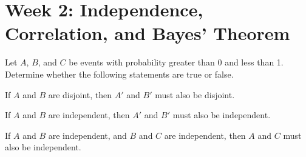 \documentclass[a4paper, 10pt]{article}
\begin{document}
\pagebreak

\section{Week 2: Independence, Correlation, and Bayes' Theorem}

\begin{problem}
Let \(A\), \(B\), and \(C\) be events with probability greater than 0 and less than 1.
Determine whether the following statements are true or false.
\begin{subproblems_alpha}
	\item If \(A\) and \(B\) are disjoint, then \(A'\) and \(B'\) must also be disjoint.
	\item If \(A\) and \(B\) are independent, then \(A'\) and \(B'\) must also be independent.
	\item If \(A\) and \(B\) are independent, and \(B\) and \(C\) are independent, then \(A\) and \(C\) must also be independent.
\end{subproblems_alpha}
\end{problem}
\end{document}
